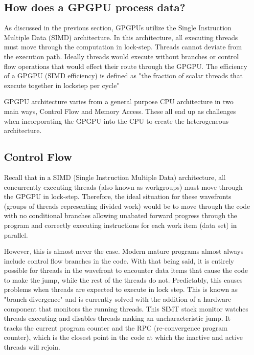 \subsection*{How does a GPGPU process data?}

As discussed in the previous section, GPGPUs utilize the Single Instruction Multiple Data (SIMD) architecture. In this architecture, all executing threads must move through the computation in lock-step. Threads cannot deviate from the execution path. Ideally threads would execute without branches or control flow operations that would effect their route through the GPGPU. The efficiency of a GPGPU (SIMD efficiency) is defined as "the fraction of scalar threads that execute together in lockstep per cycle" \cite{memcached}

GPGPU architecture varies from a general purpose CPU architecture in two main ways, Control Flow and Memory Access. These all end up as challenges when incorporating the GPGPU into the CPU to create the heterogeneous architecture. 

\subsection*{Control Flow}

Recall that in a SIMD (Single Instruction Multiple Data) architecture, all concurrently executing threads (also known as workgroups) must move through the GPGPU in lock-step. Therefore, the ideal situation for these wavefronts (groups of threads representing divided work) would be to move through the code with no conditional branches allowing unabated forward progress through the program and correctly executing instructions for each work item (data set) in parallel. 

However, this is almost never the case. Modern mature programs almost always include control flow branches in the code. With that being said, it is entirely possible for threads in the wavefront to encounter data items that cause the code to make the jump, while the rest of the threads do not. Predictably, this causes problems when threads are expected to execute in lock step. This is known as "branch divergence" and is currently solved with the addition of a hardware component that monitors the running threads. This SIMT stack monitor watches threads executing and disables threads making an uncharacteristic jump. It tracks the current program counter and the RPC (re-convergence program counter), which is the closest point in the code at which the inactive and active threads will rejoin. 

